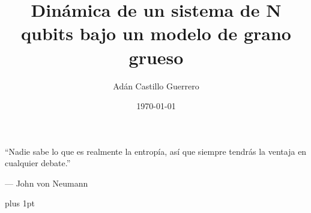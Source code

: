 \documentclass[12pt,twoside]{book}
\title{Dinámica de un sistema de N qubits bajo un modelo de grano grueso}
\author{Adán Castillo Guerrero}
\date{\today}
\begin{document}
\pagestyle{plain}

\frontmatter





\cleardoublepage



\cleardoublepage

\epigraph{
\vspace{8cm}
``Nadie sabe lo que es realmente la entropía, así que siempre tendrás la ventaja en cualquier debate.''}{--- \textup{John von Neumann}}

\cleardoublepage

\modulolinenumbers[5]
\setlength\linenumbersep{3pt}
\makeatletter
\let\LN@align\align
\let\LN@endalign\endalign
\renewcommand{\align}{\linenomath\LN@align}
\renewcommand{\endalign}{\LN@endalign\endlinenomath}
\let\LN@gather\gather
\let\LN@endgather\endgather
\renewcommand{\gather}{\linenomath\LN@gather}
\renewcommand{\endgather}{\LN@endgather\endlinenomath}
\makeatother



\tableofcontents
\newpage
\parskip=12pt plus 1pt
\parindent=15pt
\pagestyle{fancy}
\fancyhf{}
\setlength{\headheight}{15pt}
\renewcommand{\headrulewidth}{0.4pt}
\renewcommand{\footrulewidth}{0.4pt}

\fancyhf[EHL]{\nouppercase{\leftmark}}
\fancyhf[OHR]{\nouppercase{\rightmark}}
\fancyhf[EFL]{\thepage}
\fancyhf[OFR]{\thepage}

\mainmatter





\appendix

%


\end{document}
